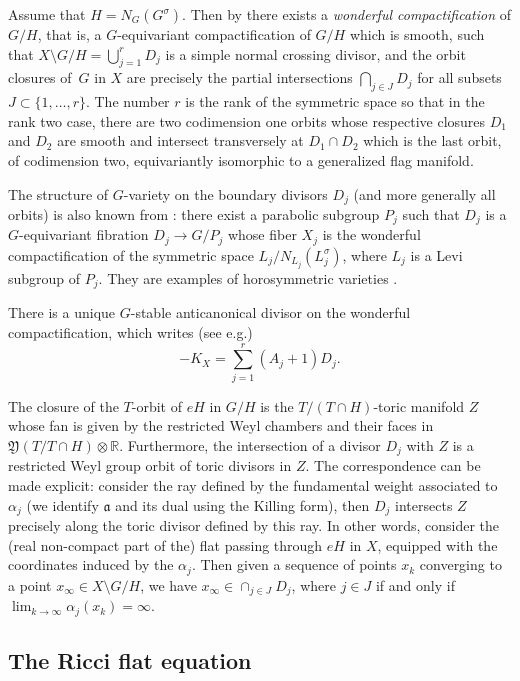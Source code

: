 \documentclass[10pt]{amsart}
\theoremstyle{plain}
\theoremstyle{definition}
\providecommand{\eg}{e.g.}\providecommand{\ie}{i.e.}\providecommand{\etc}{etc.}\providecommand{\resp}{resp.}\providecommand{\cf}{cf.}
\begin{document}
Assume that $H=N_G(G^{\sigma})$. Then by \cite{DCP83} there exists a \emph{wonderful compactification} of
$G/H$, that is, a $G$-equivariant compactification of $G/H$ which is smooth, such that
$X\setminus G/H= \bigcup_{j=1}^r D_j$ is a simple normal crossing divisor, and
the orbit closures of~$G$ in $X$ are precisely the partial intersections $\bigcap_{j\in J} D_j$
for all subsets $J\subset \{1,\ldots,r\}$.
The number $r$ is the rank of the symmetric space so that in the rank two case,
there are two codimension one orbits whose respective closures $D_1$ and $D_2$ are smooth and
intersect transversely at $D_1\cap D_2$ which is the last orbit, of codimension two, equivariantly
isomorphic to a generalized flag manifold.

The structure of $G$-variety on the boundary divisors $D_j$ (and more generally all orbits)
is also known from \cite{DCP83}: there exist a parabolic subgroup $P_j$ such that
$D_j$ is a $G$-equivariant fibration $D_j\to G/P_j$ whose fiber $X_j$ is the
wonderful compactification of the symmetric space $L_j/N_{L_j}(L_j^{\sigma})$,
where $L_j$ is a Levi subgroup of $P_j$. They are examples of horosymmetric
varieties \cite{DelHoro}.

There is a unique $G$-stable anticanonical divisor on the wonderful compactification,
which writes (see \eg \cite{Ruz12})
\[ -K_X= \sum_{j=1}^r (A_j+1)D_j. \]

The closure of the $T$-orbit of $eH$ in $G/H$ is the $T/(T\cap H)$-toric manifold $Z$
whose fan is given by the restricted Weyl chambers and their faces in
$\mathfrak{Y}(T/T\cap H)\otimes \mathbb{R}$. Furthermore, the intersection of a
divisor $D_j$ with $Z$ is a restricted Weyl group orbit of toric divisors in $Z$.
The correspondence can be made explicit: consider the ray defined by the fundamental
weight associated to $\alpha_j$ (we identify $\mathfrak{a}$ and its dual using the
Killing form), then $D_j$ intersects $Z$ precisely along the
toric divisor defined by this ray.
In other words, consider the (real non-compact part of the) flat passing
through $eH$ in $X$, equipped with the coordinates induced by the $\alpha_j$. Then
given a sequence of points $x_k$ converging to a point $x_{\infty}\in X\setminus G/H$,
we have $x_{\infty}\in \cap_{j\in J} D_j$, where $j\in J$ if and only if
$\lim_{k\to \infty}\alpha_j(x_k)= \infty$.

\subsection{The Ricci flat equation}
\end{document}

